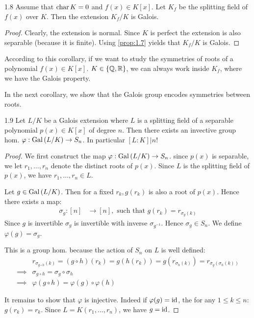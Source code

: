 \documentclass[twoside = false,	%
		headsepline,		%
		parskip = true,
		]{scrbook}						%
\begin{document}
        \begin{corollary}{}{1.8}
            Assume that $\mathrm{char} \, K = 0$ and $f(x) \in K[x]$. Let $K_f$ be the splitting field of $f(x)$ over $K$. Then the extension $K_f/K$ is Galois.
        \end{corollary}
        \begin{proof}
            Clearly, the extension is normal. Since $K$ is perfect the extension is also separable (because it is finite). Using \ref{prop:1.7} yields that $K_f/K$ is Galois.
        \end{proof}
        
        According to this corollary, if we want to study the symmetries of roots of a polynomial $f(x) \in K[x]$. $K \in \{\mathbb Q,\mathbb R\}$, we can always work inside $K_f$, where we have the Galois property.
        
        In the next corollary, we show that the Galois group encodes symmetries between roots.
        
        \begin{corollary}{}{1.9}
            Let $L/K$ be a Galois extension where $L$ is a splitting field of a separable polynomial $p(x) \in K[x]$ of degree $n$. Then there exists an invective group hom. $\varphi: \mathrm{Gal}\left( L/K\right) \rightarrow S_n$. In particular $[L:K]|n!$
        \end{corollary}
        
        \begin{proof}
            We first construct the map $\varphi: \mathrm{Gal}\left( L/K\right) \rightarrow S_n$. since $p(x)$ is separable, we let $r_1,\dots,r_n$ denote the distinct roots of $p(x)$. Since $L$ is the splitting field of $p(x)$, we have $r_1,\dots,r_n \in L$.
            
            Let $g \in \mathrm{Gal}\left( L/K\right)$. Then for a fixed $r_k, g(r_k)$ is also a root of $p(x)$. Hence there exists a map:
            \begin{align*}
                \sigma_g: [n] &\rightarrow [n], \text{ such that } g(r_k) = r_{\sigma_g(k)}
            \end{align*}
            Since $g$ is invertible $\sigma_g$ is invertible with inverse $\sigma_{g^{-1}}$. Hence $\sigma_g \in S_n$. We define $\varphi(g) = \sigma_g$.
            
            This is a group hom. because the action of $S_n$ on $L$ is well defined:
            \begin{align*}
                &r_{\sigma_{g \circ h}(k)} = (g \circ h)(r_k) = g(h(r_k)) = g(r_{\sigma_h(k)}) = r_{\sigma_g(\sigma_h(k))} \\
                \implies &\sigma_{g \circ h} = \sigma_g \circ \sigma_h \\
                \implies &\varphi(g \circ h) = \varphi(g) \circ \varphi(h)
            \end{align*}
            
            It remains to show that $\varphi$ is injective. Indeed if $\varphi(g) =\mathrm{id}$, the for any $1 \leq k \leq n$: $g(r_k) = r_k$. Since $L = K(r_1, \dots, r_n)$, we have $g = \mathrm{id}$.
        \end{proof}
        
\end{document}
